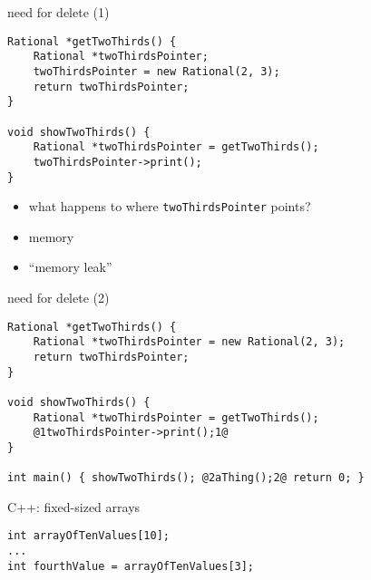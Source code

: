 \begin{frame}[fragile,label=cppNewDelete]{need for delete (1)}
\lstset{
    language=C++,
    style=smaller,
}
\begin{lstlisting}
Rational *getTwoThirds() {
    Rational *twoThirdsPointer;
    twoThirdsPointer = new Rational(2, 3);
    return twoThirdsPointer;
}

void showTwoThirds() {
    Rational *twoThirdsPointer = getTwoThirds();
    twoThirdsPointer->print();
}
\end{lstlisting}
\begin{itemize}
    \item what happens to where \texttt{twoThirdsPointer} points?
    \item<2> memory 
    \item<2> ``memory leak''
\end{itemize}
\end{frame}

\begin{frame}[fragile,label=cppNewDelete2]{need for delete (2)}
\begin{lstlisting}
Rational *getTwoThirds() {
    Rational *twoThirdsPointer = new Rational(2, 3);
    return twoThirdsPointer;
}

void showTwoThirds() {
    Rational *twoThirdsPointer = getTwoThirds();
    @1twoThirdsPointer->print();1@
}

int main() { showTwoThirds(); @2aThing();2@ return 0; }
\end{lstlisting}
\end{frame}

\begin{frame}[fragile,label=cppArray]{C++: fixed-sized arrays}
\lstset{language=C++,style=small}
\begin{lstlisting}
int arrayOfTenValues[10];
...
int fourthValue = arrayOfTenValues[3];
\end{lstlisting}
\end{frame}


